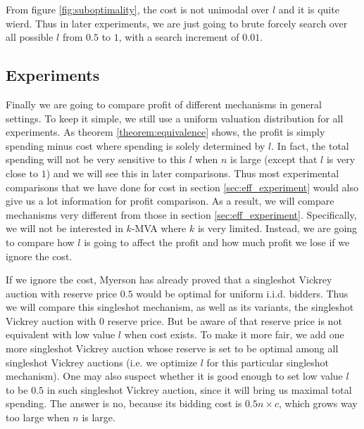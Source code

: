 From figure \ref{fig:suboptimality}, the cost is not unimodal over $l$ and it is quite wierd.
Thus in later experiments, we are just going to brute forcely search over all possible $l$ from $0.5$ to $1$,
with a search increment of $0.01$.

\subsection{Experiments}

Finally we are going to compare profit of different mechanisms in general settings.
To keep it simple, we still use a uniform valuation distribution for all
experiments.  As theorem \ref{theorem:equivalence} shows, the profit is simply
spending minus cost where spending is solely determined by $l$. In fact, the
total spending will not be very sensitive to this $l$ when $n$ is large (except
that $l$ is very close to $1$) and we will see this in later comparisons. Thus
most experimental comparisons that we have done for cost in section
\ref{sec:eff_experiment} would also give us a lot information for profit
comparison. As a result, we will compare mechanisms very different from those
in section \ref{sec:eff_experiment}. Specifically, we will not be interested in
$k$-MVA where $k$ is very limited. Instead, we are going to compare how $l$
is going to affect the profit and how much profit we lose if we ignore the cost.

If we ignore the cost, Myerson has already proved that a singleshot Vickrey
auction with reserve price $0.5$ would be optimal for uniform i.i.d. bidders.
Thus we will compare this singleshot mechanism, as well as its variants, the
singleshot Vickrey auction with $0$ reserve price. But be aware of that reserve
price is not equivalent with low value $l$  when cost exists. To make it more fair,
we add one more singleshot Vickrey auction whose reserve is set to be optimal
among all singleshot Vickrey auctions (i.e. we optimize $l$ for this particular
singleshot mechanism).
One may also suspect whether it is good enough to set low value $l$ to be $0.5$
in such singleshot Vickrey auction, since it will bring us maximal total
spending. The answer is no, because its bidding cost is $0.5 n \times c$, which
grows way too large when $n$ is large.


